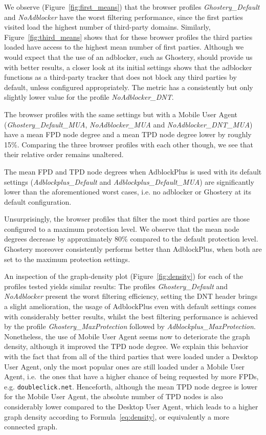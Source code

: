 We observe (Figure~\ref{fig:first_means}) that the browser profiles \textit{Ghostery\_Default} and \textit{NoAdblocker} have the worst filtering performance, since the first parties visited load the highest number of third-party domains. Similarly, Figure~\ref{fig:third_means} shows that for these browser profiles the third parties loaded have access to the highest mean number of first parties. Although we would expect that the use of an adblocker, such as Ghostery, should provide us with better results, a closer look at its initial settings shows that the adblocker functions as a third-party tracker that does not block any third parties by default, unless configured appropriately. The metric has a consistently but only slightly lower value for the profile \textit{NoAdblocker\_DNT}.

The browser profiles with the same settings but with a Mobile User Agent (\textit{Ghostery\_\allowbreak Default\_\allowbreak MUA}, \textit{NoAdblocker\_\allowbreak MUA} and \textit{NoAdblocker\_\allowbreak DNT\_\allowbreak MUA}) have a mean FPD node degree and a mean TPD node degree lower by roughly 15\%. Comparing the three browser profiles with each other though, we see that their relative order remains unaltered.

The mean FPD and TPD node degrees when AdblockPlus is used with its default settings (\textit{Adblockplus\_\allowbreak Default} and \textit{Adblockplus\_\allowbreak Default\_\allowbreak MUA}) are significantly lower than the aforementioned worst cases, i.e. no adblocker or Ghostery at its default configuration.

Unsurprisingly, the browser profiles that filter the most third parties are those configured to a maximum protection level. We observe that the mean node degrees decrease by approximately 80\% compared to the default protection level. Ghostery moreover consistently performs better than AdblockPlus, when both are set to the maximum protection settings.

An inspection of the graph-density plot (Figure~\ref{fig:density}) for each of the profiles tested yields similar results: The profiles \textit{Ghostery\_\allowbreak Default} and \textit{NoAdblocker} present the worst filtering efficiency, setting the DNT header brings a slight amelioration, the usage of AdblockPlus even with default settings comes with considerably better results, whilst the best filtering performance is achieved by the profile \textit{Ghostery\_\allowbreak MaxProtection} followed by \textit{Adblockplus\_\allowbreak MaxProtection}. Nonetheless, the use of Mobile User Agent seems now to deteriorate the graph density, although it improved the TPD node degree. We explain this behavior with the fact that from all of the third parties that were loaded under a Desktop User Agent, only the most popular ones are still loaded under a Mobile User Agent, i.e.\ the ones that have a higher chance of being requested by more FPDs, e.g. \texttt{doubleclick.net}. Henceforth, although the mean TPD node degree is lower for the Mobile User Agent, the absolute number of TPD nodes is also considerably lower compared to the Desktop User Agent, which leads to a higher graph density according to Formula~\ref{eq:density}, or equivalently a more connected graph.

